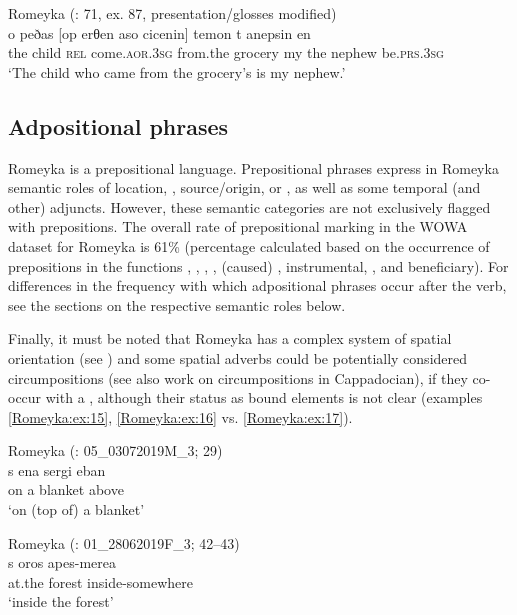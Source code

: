 \documentclass[output=paper,colorlinks,citecolor=brown]{langscibook}
\begin{document}
\ea\label{Romeyka:ex:14}
Romeyka (\citealt{neocleous_word_2020}: 71, ex. 87, presentation/glosses modified) \\
\gll o peðas [op erθen aso cicenin] temon t anepsin en \\
the child \textsc{rel} come\textsc{.aor.3sg} from.the grocery my the nephew be\textsc{.prs.3sg} \\
\glt `The child who came from the grocery's is my nephew.'  \\
\z

\subsection{Adpositional phrases}\label{Romeyka:ss:4.2}

Romeyka is a prepositional language. Prepositional phrases express in Romeyka semantic roles of location, , source/origin,  or , as well as some temporal (and other) adjuncts. However, these semantic categories are not exclusively flagged with prepositions. The overall rate of prepositional marking in the WOWA dataset for Romeyka is 61\% (percentage calculated based on the occurrence of prepositions in the functions , , , , (caused) , instrumental, ,  and beneficiary). For differences in the frequency with which adpositional phrases occur after the verb, see the sections on the respective semantic roles below.

Finally, it must be noted that Romeyka has a complex system of spatial orientation (see \citealt{schreibergrammar2022}) and some spatial adverbs could be potentially considered circumpositions (see also \citeauthor{karatsareas2016asia} \citeyear{karatsareas2016asia} work on circumpositions in Cappadocian), if they co-occur with a , although their status as bound elements is not clear (examples \ref{Romeyka:ex:15}, \ref{Romeyka:ex:16} vs. \ref{Romeyka:ex:17}).

\ea\label{Romeyka:ex:15}
Romeyka (\citealt{schreiber_inprep}: 05\_03072019M\_3; 29) \\
\gll s ena sergi eban \\
on a blanket above \\
\glt `on (top of) a blanket'
\z

\ea\label{Romeyka:ex:16}
Romeyka (\citealt{schreiber_inprep}: 01\_28062019F\_3; 42--43) \\
\gll s oros apes-merea \\
at.the forest inside-somewhere \\
\glt `inside the forest'  \\
\z
\end{document}
